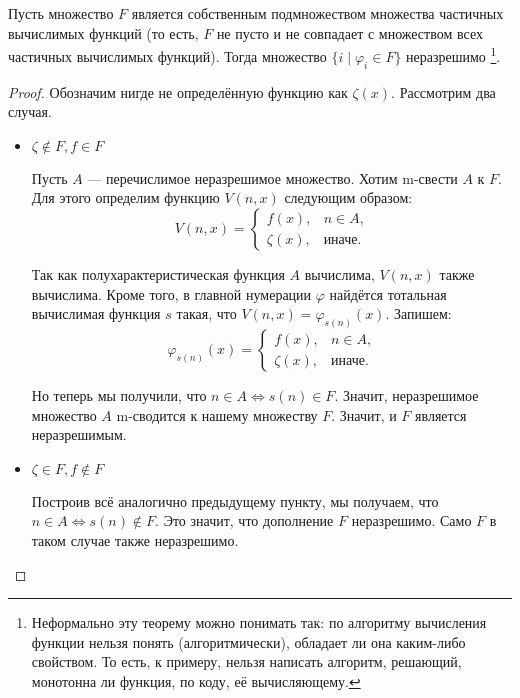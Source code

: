 \documentclass{article}
\begin{document}
    \begin{theorem}
        Пусть множество \(F\) является собственным подмножеством множества частичных вычислимых
        функций (то есть, \(F\) не пусто и не совпадает с множеством всех частичных вычислимых
        функций). Тогда множество \(\{i \mid \varphi_i \in F\}\) неразрешимо \footnote{Неформально
        эту теорему можно понимать так: по алгоритму вычисления функции нельзя понять
        (алгоритмически), обладает ли она каким-либо свойством. То есть, к примеру, нельзя
        написать алгоритм, решающий, монотонна ли функция, по коду, её вычисляющему.}.
    \end{theorem}

    \begin{proof}
        Обозначим нигде не определённую функцию как \(\zeta(x)\). Рассмотрим два случая.

        \begin{itemize}
            \item \(\zeta \not\in F, f \in F\)

            Пусть \(A\) --- перечислимое неразрешимое множество. Хотим m-свести \(A\) к \(F\). Для этого
            определим функцию \(V(n, x)\) следующим образом:
            $$
                V(n, x) =
                \begin{cases}
                    f(x), & \text{\(n \in A\),}\\
                    \zeta(x), & \text{иначе.}
                \end{cases}
            $$

            Так как полухарактеристическая функция \(A\) вычислима, \(V(n, x)\) также вычислима. Кроме
            того, в главной нумерации \(\varphi\) найдётся тотальная вычислимая функция \(s\) такая, что
            \(V(n, x) = \varphi_{s(n)}(x)\). Запишем:
            $$
                \varphi_{s(n)}(x) =
                \begin{cases}
                    f(x), & \text{\(n \in A\),}\\
                    \zeta(x), & \text{иначе.}
                \end{cases}
            $$

            Но теперь мы получили, что \(n \in A \iff s(n) \in F\). Значит, неразрешимое множество \(A\)
            m-сводится к нашему множеству \(F\). Значит, и \(F\) является неразрешимым.

            \item \(\zeta \in F, f \not\in F\)

            Построив всё аналогично предыдущему пункту, мы получаем, что \(n \in A \iff s(n) \not\in F\).
            Это значит, что дополнение \(F\) неразрешимо. Само \(F\) в таком случае также неразрешимо.
        \end{itemize}
    \end{proof}
\end{document}
